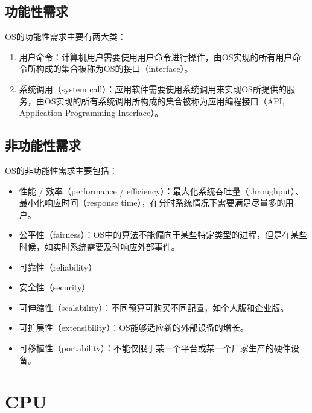 \subsection{功能性需求}

OS的功能性需求主要有两大类：

\begin{enumerate}
	\item 用户命令：计算机用户需要使用用户命令进行操作，由OS实现的所有用户命令所构成的集合被称为OS的接口（interface）。

	\item 系统调用（system call）：应用软件需要使用系统调用来实现OS所提供的服务，由OS实现的所有系统调用所构成的集合被称为应用编程接口（API, Application Programming Interface）。
\end{enumerate}

\vspace{0.5cm}

\subsection{非功能性需求}

OS的非功能性需求主要包括：

\begin{itemize}
	\item 性能 / 效率（performance / efficiency）：最大化系统吞吐量（throughput）、最小化响应时间（response time），在分时系统情况下需要满足尽量多的用户。

	\item 公平性（fairness）：OS中的算法不能偏向于某些特定类型的进程，但是在某些时候，如实时系统需要及时响应外部事件。

	\item 可靠性（reliability）

	\item 安全性（security）

	\item 可伸缩性（scalability）：不同预算可购买不同配置，如个人版和企业版。

	\item 可扩展性（extensibility）：OS能够适应新的外部设备的增长。

	\item 可移植性（portability）：不能仅限于某一个平台或某一个厂家生产的硬件设备。
\end{itemize}

\newpage

\section{CPU}

